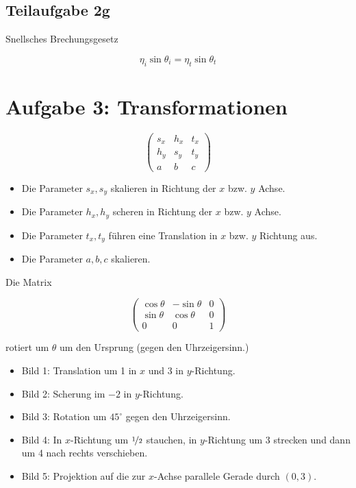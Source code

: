 \documentclass[a4paper]{scrartcl}
\begin{document}
\subsection*{Teilaufgabe 2g}
Snellsches Brechungsgesetz

\[\eta_i \sin \theta_i = \eta_t \sin \theta_t\]

\section*{Aufgabe 3: Transformationen}
\[\begin{pmatrix}s_x & h_x & t_x\\h_y & s_y & t_y\\a & b & c\end{pmatrix}\]


\begin{itemize}
    \item Die Parameter $s_x, s_y$ skalieren in Richtung der $x$ bzw. $y$
          Achse.
    \item Die Parameter $h_x, h_y$ scheren in Richtung der $x$ bzw. $y$ Achse.
    \item Die Parameter $t_x, t_y$ führen eine Translation in $x$ bzw. $y$
          Richtung aus.
    \item Die Parameter $a, b, c$ skalieren.
\end{itemize}


Die Matrix

\[\begin{pmatrix}\cos \theta & -\sin \theta & 0\\\sin \theta & \cos \theta & 0\\0 & 0 & 1\end{pmatrix}\]

rotiert um $\theta$ um den Ursprung (gegen den Uhrzeigersinn.)

\begin{itemize}
    \item Bild 1: Translation um 1 in $x$ und 3 in $y$-Richtung.
    \item Bild 2: Scherung im $-2$ in $y$-Richtung.
    \item Bild 3: Rotation um $45^\circ$ gegen den Uhrzeigersinn.
    \item Bild 4: In $x$-Richtung um $\nicefrac{1}{2}$ stauchen, in $y$-Richtung
                  um 3 strecken und dann um 4 nach rechts verschieben.
    \item Bild 5: Projektion auf die zur $x$-Achse parallele Gerade durch $(0, 3)$.
\end{itemize}
\end{document}
